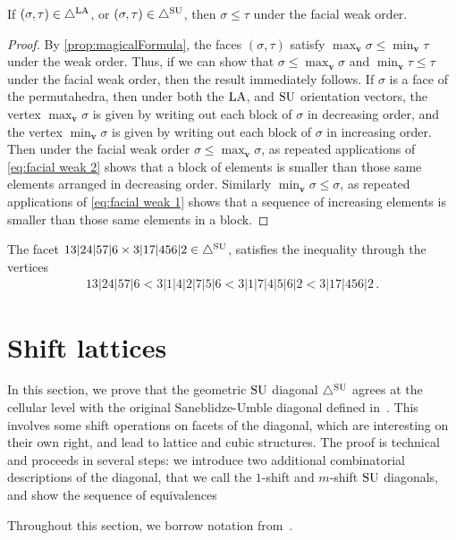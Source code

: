 \begin{proposition}
If $(\sigma,\tau)\in \triangle^{\mathrm{LA}}$, or $(\sigma,\tau)\in \triangle^{\mathrm{SU}}$, then $\sigma \leq \tau$ under the facial weak order.
\end{proposition}

\begin{proof}
By \cref{prop:magicalFormula}, the faces $(\sigma,\tau)$ satisfy $\max_{\mathbf{v}} \sigma \leq \min_{\mathbf{v}} \tau$ under the weak order.
Thus, if we can show that $\sigma\leq \max_{\mathbf{v}} \sigma$ and $\min_{\mathbf{v}} \tau \leq \tau$ under the facial weak order, then the result immediately follows.
If $\sigma$ is a face of the permutahedra, then under both the $\mathrm{LA}$, and $\mathrm{SU}$ orientation vectors, the vertex $\max_{\mathbf{v}} \sigma$ is given by writing out each block of $\sigma$ in decreasing order, and the vertex $\min_{\mathbf{v}} \sigma$ is given by writing out each  block of $\sigma$ in increasing order.
Then under the facial weak order
$\sigma \leq \max_{\mathbf{v}} \sigma$, as repeated applications of \cref{eq:facial weak 2} shows that a block of elements is smaller than those same elements arranged in decreasing order.
Similarly $\min_{\mathbf{v}} \sigma \leq \sigma$, as repeated applications of \cref{eq:facial weak 1} shows that a sequence of increasing elements is smaller than those same elements in a block. 
\end{proof}

\begin{example}
The facet $13|24|57|6 \times 3|17|456|2 \in \triangle^{\mathrm{SU}}$, satisfies the inequality through the vertices
\begin{align*}
    13|24|57|6 <  3|1|4|2|7|5|6 <  3|1|7|4|5|6|2 <  3|17|456|2 \, .
\end{align*}
\end{example}


\section{Shift lattices}
\label{sec:shifts}

In this section, we prove that the geometric $\mathrm{SU}$ diagonal $\triangle^{\mathrm{SU}}$ agrees at the cellular level with the original Saneblidze-Umble diagonal defined in~\cite{SaneblidzeUmble}.
This involves some shift operations on facets of the diagonal, which are interesting on their own right, and lead to lattice and cubic structures.
The proof is technical and proceeds in several steps: we introduce two additional combinatorial descriptions of the diagonal, that we call the $1$-shift and $m$-shift $\mathrm{SU}$ diagonals, and show the sequence of equivalences
\begin{center}
\end{center}
Throughout this section, we borrow notation from~\cite{SaneblidzeUmble-comparingDiagonals}.

